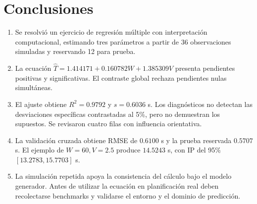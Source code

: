 \documentclass[11pt,a4paper]{article}
\begin{document}
\section{Conclusiones}
\begin{enumerate}
\item Se resolvió un ejercicio de regresión múltiple con interpretación computacional, estimando tres parámetros a partir de 36 observaciones simuladas y reservando 12 para prueba.
\item La ecuación $\widehat T=1.414171+0.160782W+1.385309V$ presenta pendientes positivas y significativas. El contraste global rechaza pendientes nulas simultáneas.
\item El ajuste obtiene $R^2=0.9792$ y $s=0.6036$ s. Los diagnósticos no detectan las desviaciones específicas contrastadas al 5\%, pero no demuestran los supuestos. Se revisaron cuatro filas con influencia orientativa.
\item La validación cruzada obtiene RMSE de $0.6100$ s y la prueba reservada $0.5707$ s. El ejemplo de $W=60,V=2.5$ produce $14.5243$ s, con IP del 95\% $[13.2783,15.7703]$ s.
\item La simulación repetida apoya la consistencia del cálculo bajo el modelo generador. Antes de utilizar la ecuación en planificación real deben recolectarse benchmarks y validarse el entorno y el dominio de predicción.
\end{enumerate}
\end{document}

